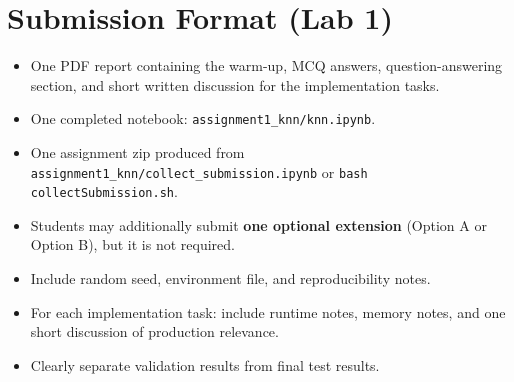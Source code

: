 \section*{Submission Format (Lab 1)}
\begin{itemize}
  \item One PDF report containing the warm-up, MCQ answers, question-answering section, and short written discussion for the implementation tasks.
  \item One completed notebook: \texttt{assignment1\_knn/knn.ipynb}.
  \item One assignment zip produced from \texttt{assignment1\_knn/collect\_submission.ipynb} or \texttt{bash collectSubmission.sh}.
  \item Students may additionally submit \textbf{one optional extension} (Option A or Option B), but it is not required.
  \item Include random seed, environment file, and reproducibility notes.
  \item For each implementation task: include runtime notes, memory notes, and one short discussion of production relevance.
  \item Clearly separate validation results from final test results.
\end{itemize}
